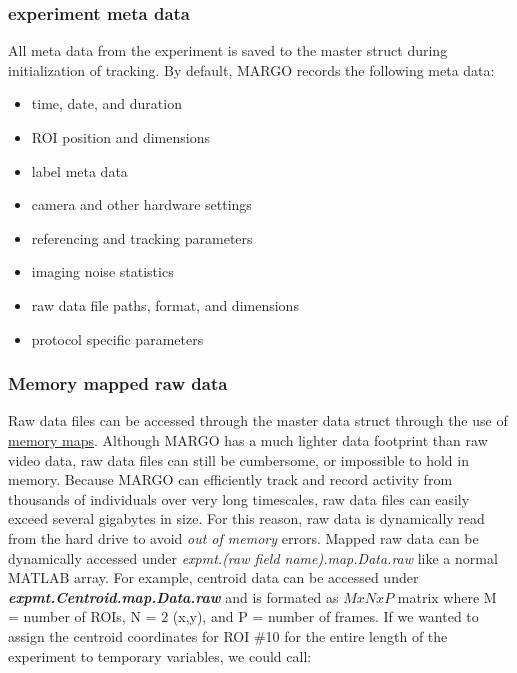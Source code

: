 \documentclass[11pt]{article}
\begin{document}
\subsubsection{experiment meta data}

All meta data from the experiment is saved to the master struct during initialization of tracking. By default, MARGO records the following meta data:


\begin{multicols}{2}
	\begin{itemize}
		\itemsep0em
		\item time, date, and duration
		\item ROI position and dimensions
		\item label meta data
		\item camera and other hardware settings
		\item referencing and tracking parameters
		\item imaging noise statistics
		\item raw data file paths, format, and dimensions
		\item protocol specific parameters
	\end{itemize}
\end{multicols}


\subsubsection{Memory mapped raw data}

Raw data files can be accessed through the master data struct through the use of \href{https://www.mathworks.com/help/matlab/ref/memmapfile.html}{memory maps}. Although MARGO has a much lighter data footprint than raw video data, raw data files can still be cumbersome, or impossible to hold in memory. Because MARGO can efficiently track and record activity from thousands of individuals over very long timescales, raw data files can easily exceed several gigabytes in size. For this reason, raw data is dynamically read from the hard drive to avoid \textit{out of memory} errors. Mapped raw data can be dynamically accessed under \textit{expmt.(raw field name).map.Data.raw} like a normal MATLAB array. For example, centroid data can be accessed under \textbf{\textit{expmt.Centroid.map.Data.raw}} and is formated as $ M x N x P$ matrix where M = number of ROIs, N = 2 (x,y), and P = number of frames. If we wanted to assign the centroid coordinates for ROI \#10 for the entire length of the experiment to temporary variables, we could call:
\end{document}
